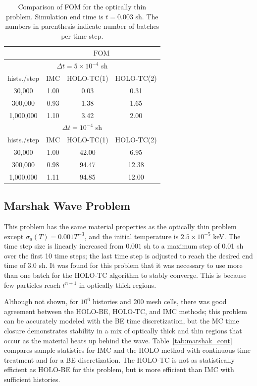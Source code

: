 \documentclass{anstrans}
\newcommand{\FOM}{\ensuremath{\text{FOM}}}
\begin{document}
\begin{table}
\centering
\caption{\label{tab:fom_thin} {Comparison of FOM for the optically
    thin problem.  Simulation end time is $t=0.003$ sh. The numbers in parenthesis indicate number of
batches per time step.}}
\begin{tabular}{|c|ccc|}\cline{2-4}
    \multicolumn{1}{c|}{}       &
    \multicolumn{3}{|c|}{\FOM} \\ \hline
    \multicolumn{4}{|c|}{$\Delta t = 5\times10^{-4}$ sh} \\\hline
hists./step   &   IMC   & HOLO-TC(1) & HOLO-TC(2) \\ \hline
   30,000     &   1.00  & 0.03  &  0.31      \\
  300,000     &   0.93  & 1.38  &  1.65     \\ 
  1,000,000   &   1.10  & 3.42  &  2.00      \\ \hline
    \multicolumn{4}{|c|}{$\Delta t = 10^{-4}$ sh} \\\hline
hists./step   &  IMC   & HOLO-TC(1) & HOLO-TC(2) \\ \hline
   30,000     &  1.00  &  42.00    & 6.95    \\
  300,000     &  0.98  &  94.47    & 12.38    \\ 
  1,000,000   &  1.11  &  94.85    & 12.00   \\ \hline
\end{tabular}
\end{table}

\subsection{Marshak Wave Problem}

This problem has the same material properties as the optically thin problem except
$\sigma_a(T) = 0.001 T^{-3}$, and the initial temperature is $2.5\times10^{-5}$ keV.  The time step size is linearly increased from $0.001$ sh to a
maximum step of 0.01 sh over the first 10 time steps; the last time step is adjusted to
reach the desired end time of $3.0$ sh.  It was found for this problem that it was
necessary to use more than one batch for the HOLO-TC algorithm to stably converge.
This is because few particles reach $t^{n+1}$ in optically
thick regions.

Although not shown, for $10^6$ histories and 200 mesh cells, there was good agreement
between the HOLO-BE, HOLO-TC, and IMC methods; this problem can be accurately modeled with
the BE time
discretization, but the MC time closure demonstrates stability in a mix of optically thick
and thin regions that occur as the material heats up behind the wave.
Table~\ref{tab:marshak_cont} compares sample statistics for IMC and the HOLO method with
continuous time treatment and for a BE discretization. The HOLO-TC is not as statistically
efficient as HOLO-BE for this problem, but is more efficient than IMC with
sufficient histories.  
\end{document}
